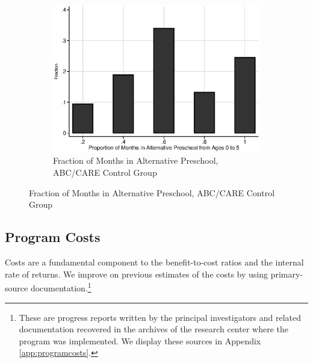 \begin{figure}[H]
\begin{subfigure}[h]{0.7\textwidth}
	\centering
	\caption{Fraction of Months in Alternative Preschool, ABC/CARE Control Group} \label{fig:proportion-alt-pre}
		\includegraphics[width=\textwidth]{output/abccare_Vfractimes.eps}
\end{subfigure}
\end{figure}

\subsection{Program Costs} \label{section:programscosts}

Costs are a fundamental component to the benefit-to-cost ratios and the internal rate of returns. We improve on previous estimates of the costs by using primary-source documentation.\footnote{These are progress reports written by the principal investigators and related documentation recovered in the archives of the research center where the program was implemented. We display these sources in Appendix \ref{app:programcosts}.}

